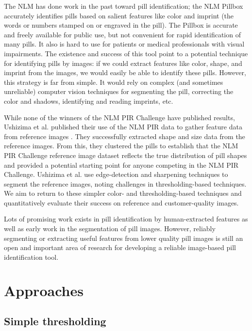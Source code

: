 \documentclass{article}
\begin{document}
The NLM has done work in the past toward pill identification; the NLM Pillbox accurately identifies pills based on salient features like color and imprint (the words or numbers stamped on or engraved in the pill)\cite{pillbox}. The Pillbox is accurate and freely available for public use, but not convenient for rapid identification of many pills. It also is hard to use for patients or medical professionals with visual impairments. The existence and success of this tool point to a potential technique for identifying pills by images: if we could extract features like color, shape, and imprint from the images, we would easily be able to identify these pills. However, this strategy is far from simple.  It would rely on complex (and sometimes unreliable) computer vision techniques for segmenting the pill, correcting the color and shadows, identifying and reading imprints, etc. 

While none of the winners of the NLM PIR Challenge have published results, Ushizima et al. published their use of the NLM PIR data to gather feature data from reference images \cite{ushizima}. They successfully extracted shape and size data from the reference images. From this, they clustered the pills to establish that the NLM PIR Challenge reference image dataset reflects the true distribution of pill shapes and provided a potential starting point for anyone competing in the NLM PIR Challenge. Ushizima et al. use edge-detection and sharpening techniques to segment the reference images, noting challenges in thresholding-based techniques. We aim to return to these simpler color- and thresholding-based techniques and quantitatively evaluate their success on reference and customer-quality images. 

Lots of promising work exists in pill identification by human-extracted features as well as early work in the segmentation of pill images. However, reliably segmenting or extracting useful features from lower quality pill images is still an open and important area of research for developing a reliable image-based pill identification tool.

\section{Approaches}
\label{approaches}

\subsection{Simple thresholding}
\end{document}
